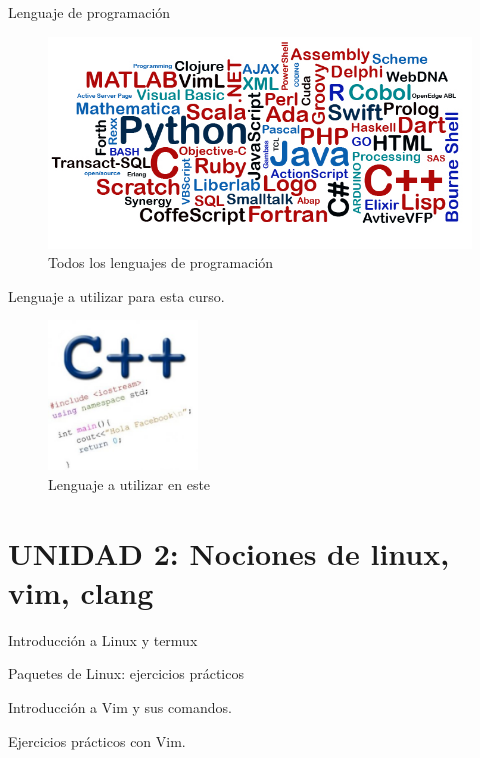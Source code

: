 \documentclass[presentation, aspectratio=54]{beamer}
\begin{document}
\begin{frame}[label={sec:org69dc9b7}]{Lenguaje de programación}
\begin{figure}[htbp]
\centering
\includegraphics[width=.9\linewidth]{./images/LenguajesDeProgramacion.jpg}
\caption{Todos los lenguajes de programación}
\end{figure}
\end{frame}
\begin{frame}[label={sec:orge773110}]{Lenguaje a utilizar para esta curso.}
\begin{figure}[htbp]
\centering
\includegraphics[width=150px]{./images/cpp.jpg}
\caption{Lenguaje a utilizar en este}
\end{figure}
\end{frame}

\section{UNIDAD 2: Nociones de linux, vim, clang}
\label{sec:orgac29f85}
\begin{frame}[label={sec:orgcf420ec}]{Introducción a Linux y termux}
\end{frame}
\begin{frame}[label={sec:orgf1c43b8}]{Paquetes de Linux: ejercicios prácticos}
\end{frame}
\begin{frame}[label={sec:org9b8c9e3}]{Introducción a Vim  y sus comandos.}
\end{frame}
\begin{frame}[label={sec:org75f8fad}]{Ejercicios prácticos con Vim.}
\end{frame}
\end{document}

